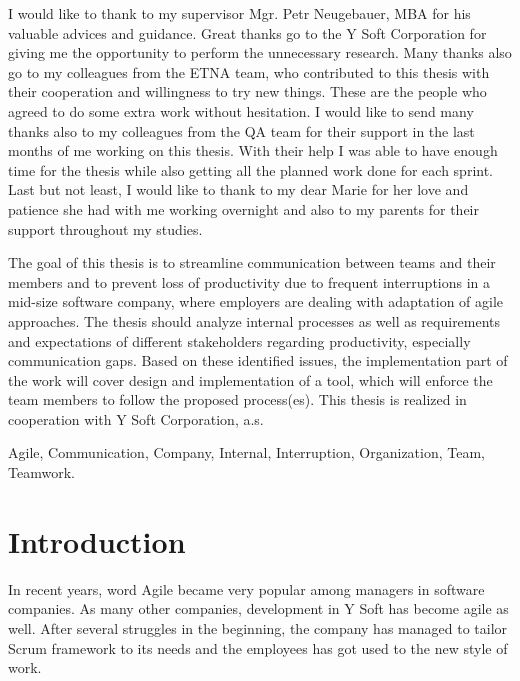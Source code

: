 \documentclass[11pt,singleside]{myfithesis2}
\begin{document}
\FrontMatter
\ThesisTitlePage
\begin{ThesisDeclaration}
\DeclarationText
\AdvisorName
\end{ThesisDeclaration}
\begin{ThesisThanks}
I would like to thank to my supervisor Mgr. Petr Neugebauer, MBA for his valuable advices and guidance. Great thanks go to the Y Soft Corporation for giving me the opportunity to perform the unnecessary research. Many thanks also go to my colleagues from the ETNA team, who contributed to this thesis with their cooperation and willingness to try new things. These are the people who agreed to do some extra work without hesitation. I would like to send many thanks also to my colleagues from the QA team for their support in the last months of me working on this thesis. With their help I was able to have enough time for the thesis while also getting all the planned work done for each sprint. Last but not least, I would like to thank to my dear Marie for her love and patience she had with me working overnight and also to my parents for their support throughout my studies. 
\end{ThesisThanks}
\begin{ThesisAbstract}
The goal of this thesis is to streamline communication between teams and their members and to prevent loss of productivity due to frequent interruptions in a mid-size software company, where employers are dealing with adaptation of agile approaches. The thesis should analyze internal processes as well as requirements and expectations of different stakeholders regarding productivity, especially communication gaps. Based on these identified issues, the implementation part of the work will cover design and implementation of a tool, which will enforce the team members to follow the proposed process(es). This thesis is realized in cooperation with Y Soft Corporation, a.s.
\end{ThesisAbstract}
\begin{ThesisKeyWords}
Agile, Communication, Company, Internal, Interruption, Organization, Team, Teamwork.
\end{ThesisKeyWords}
\MainMatter
\tableofcontents %

\chapter{Introduction}
In recent years, word Agile became very popular among managers in software companies. As many other companies, development in Y Soft has become agile as well. After several struggles in the beginning, the company has managed to tailor Scrum framework to its needs and the employees has got used to the new style of work.
\end{document}
